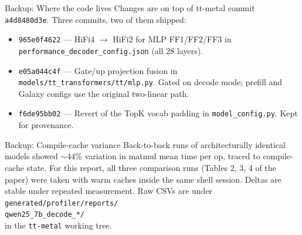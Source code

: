 \documentclass[aspectratio=169,10pt]{beamer}
\begin{document}
\begin{frame}{Backup: Where the code lives}
  \small
  Changes are on top of tt-metal commit \texttt{a4d8480d3e}. Three
  commits, two of them shipped:
  \vfill
  \begin{itemize}
    \item \texttt{965e0f4622} --- HiFi4 $\to$ HiFi2 for MLP FF1/FF2/FF3
          in \texttt{performance\_decoder\_config.json} (all 28 layers).
    \item \texttt{e05a044c4f} --- Gate/up projection fusion in
          \texttt{models/tt\_transformers/tt/mlp.py}. Gated on
          decode mode; prefill and Galaxy configs use the original
          two-linear path.
    \item \texttt{f6de95bb02} --- Revert of the TopK vocab padding in
          \texttt{model\_config.py}. Kept for provenance.
  \end{itemize}
\end{frame}

\begin{frame}{Backup: Compile-cache variance}
  Back-to-back runs of architecturally identical models showed
  $\sim$44\% variation in matmul mean time per op, traced to
  compile-cache state.
  \vfill
  For this report, all three comparison runs (Tables 2, 3, 4 of the
  paper) were taken with warm caches inside the same shell session.
  Deltas are stable under repeated measurement.
  \vfill
  Raw CSVs are under\\
  \small
  \texttt{generated/profiler/reports/}\\
  \texttt{qwen25\_7b\_decode\_*/}\\
  in the \texttt{tt-metal} working tree.
\end{frame}
\end{document}
